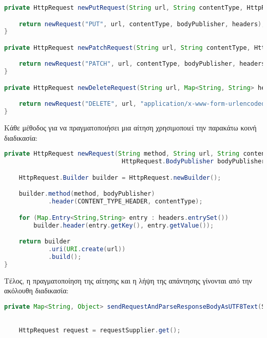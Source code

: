 \begin{itemize}
\begin{lstlisting}[language=java]
private HttpRequest newPutRequest(String url, String contentType, HttpRequest.BodyPublisher bodyPublisher, Map<String, String> headers) {

    return newRequest("PUT", url, contentType, bodyPublisher, headers);
}

private HttpRequest newPatchRequest(String url, String contentType, HttpRequest.BodyPublisher bodyPublisher, Map<String, String> headers) {

    return newRequest("PATCH", url, contentType, bodyPublisher, headers);
}

private HttpRequest newDeleteRequest(String url, Map<String, String> headers) {

    return newRequest("DELETE", url, "application/x-www-form-urlencoded", HttpRequest.BodyPublishers.noBody(), headers);
}

\end{lstlisting}

Κάθε μέθοδος για να πραγματοποιήσει μια αίτηση χρησιμοποιεί την παρακάτω κοινή διαδικασία:

\begin{lstlisting}[language=java]  
private HttpRequest newRequest(String method, String url, String contentType,
                                HttpRequest.BodyPublisher bodyPublisher, Map<String, String> headers) {

    HttpRequest.Builder builder = HttpRequest.newBuilder();

    builder.method(method, bodyPublisher)
            .header(CONTENT_TYPE_HEADER, contentType);

    for (Map.Entry<String,String> entry : headers.entrySet())
        builder.header(entry.getKey(), entry.getValue());

    return builder
            .uri(URI.create(url))
            .build();
}
\end{lstlisting}

Τέλος,
η πραγματοποίηση της  αίτησης 
και η λήψη της απάντησης γίνονται από την ακόλουθη διαδικασία:

\begin{lstlisting}[language=java]
private Map<String, Object> sendRequestAndParseResponseBodyAsUTF8Text(Supplier<HttpRequest> requestSupplier,
                                                                        Function<Reader, Map<String, Object>> bodyProcessor) {

    HttpRequest request = requestSupplier.get();


\end{lstlisting}
\end{itemize}
